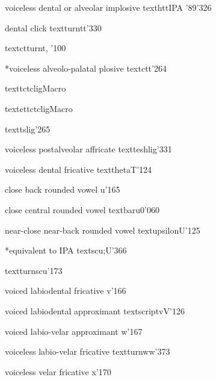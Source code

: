 %
  {voiceless dental or alveolar implosive}%
  {\tbs texthtt}{}{IPA '89}{'326}

%
  {dental click}%
  {\tbs textturnt}{\tbs*t}{\ipaold}{'330}

%
  {}%
  {\tbs textctturnt}{}{\cite{Hottentot}, \PSG}{'100}

%
  {*voiceless alveolo-palatal plosive}%
  {\tbs textctt}{}{}{'264}

%
  {}%
  {\tbs texttctclig}{}{}{Macro}

%
  {}%
  {\tbs textcttctclig}{}{}{Macro}

%
  {}%
  {\tbs texttslig}{}{\ipaold}{'265}

%
  {voiceless postalveolar affricate}%
  {\tbs textteshlig}{}{\ipaall}{'331}

%
  {voiceless dental fricative}%
  {\tbs texttheta}{T}{\ipaall}{'124}

%
  {close back rounded vowel}%
  {u}{}{\ipaall}{'165}

%
  {close central rounded vowel}%
  {\tbs textbaru}{0}{\ipaall}{'060}

%
  {near-close near-back rounded vowel}%
  {\tbs textupsilon}{U}{\ipanew}{'125}

%
  {*equivalent to IPA \textupsilon}%
  {\tbs textscu}{\tbs;U}{\ipaall}{'366}

%
  {}%
  {\tbs textturnscu}{}{\PSG}{'173}

%
  {voiced labiodental fricative}%
  {v}{}{\ipaall}{'166}

%
  {voiced labiodental approximant}%
  {\tbs textscriptv}{V}{\ipaall}{'126}%

%
  {voiced labio-velar approximant}%
  {w}{}{\ipaall}{'167}

%
  {voiceless labio-velar fricative}%
  {\tbs textturnw}{\tbs*w}{\ipaall}{'373}

%
  {voiceless velar fricative}%
  {x}{}{\ipaall}{'170}

